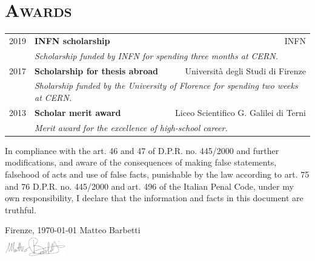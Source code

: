 \documentclass[a4paper, 11pt, notitlepage]{article}
\begin{document}
\vskip 12mm

\section*{\textsc{Awards}}
\begin{tabular*}{\textwidth}{cl @{\extracolsep{\fill}} r}
    {\small 2019} & \textbf{INFN scholarship} & {\small INFN}\\
    & \multicolumn{2}{l}{\small \emph{Scholarship funded by INFN for spending three months at CERN.}}\\ [3 mm]

    {\small 2017} & \textbf{Scholarship for thesis abroad} & {\small Università degli Studi di Firenze}\\
    & \multicolumn{2}{l}{\small \emph{Sholarship funded by the University of Florence for spending two weeks at CERN.}}\\ [3 mm]
    
    {\small 2013} & \textbf{Scholar merit award} & {\small Liceo Scientifico G. Galilei di Terni}\\
    & \multicolumn{2}{l}{\small \emph{Merit award for the excellence of high-school career.}}\\
\end{tabular*}

\vskip 18mm

\noindent
{\small In compliance with the art. 46 and 47 of D.P.R. no. 445/2000 and further modifications, and aware of the consequences of making false statements, falsehood of acts and use of false facts, punishable by the law according to art. 75 and 76 D.P.R. no. 445/2000 and art. 496 of the Italian Penal Code, under my own responsibility, I declare that the information and facts in this document are truthful.}
  
\vskip 6mm 

\noindent
{\small Firenze, \today}
\hfill {\small Matteo Barbetti}\\ [3mm]
\null \hfill \includegraphics[width=0.20\textwidth]{academic-cv/phd-applications/img/signature.png}

\end{document}
